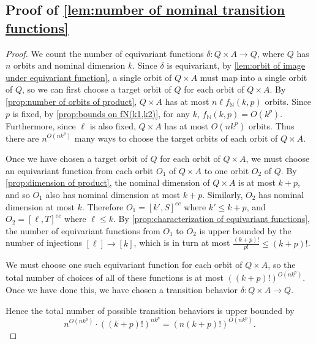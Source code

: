 \documentclass[11pt,a4paper]{amsart}
\theoremstyle{definition}
\newcommand{\bb}{\mathbb}
\begin{document}
\subsection{Proof of \autoref{lem:number of nominal transition functions}} \label{appendix:proof of number of nominal transition functions}

\begin{proof}
    We count the number of equivariant functions $\delta : Q \times A \to Q$, where $Q$ has $n$ orbits and nominal dimension $k$. 
    Since $\delta$ is equivariant, by \autoref{lem:orbit of image under equivariant function}, a single orbit of $Q \times A$ must map into a single orbit of $Q$, so we can first choose a target orbit of $Q$ for each orbit of $Q \times A$.
    By \autoref{prop:number of orbits of product}, $Q \times A$ has at most $n \ell f_{\bb N}(k,p)$ orbits.
    Since $p$ is fixed, by \autoref{prop:bounds on fN(k1,k2)}, for any $k$, $f_{\bb N}(k,p) = O(k^{p})$.
    Furthermore, since $\ell$ is also fixed, $Q \times A$ has at most $O(nk^{p})$ orbits.
    Thus there are $n^{O(nk^{p})}$ many ways to choose the target orbits of each orbit of $Q \times A$. 
    
    Once we have chosen a target orbit of $Q$ for each orbit of $Q \times A$, we must choose an equivariant function from each orbit $O_1$ of $Q \times A$ to one orbit $O_2$ of $Q$. 
    By \autoref{prop:dimension of product}, the nominal dimension of $Q \times A$ is at most $k+p$, and so $O_1$ also has nominal dimension at most $k+p$.
    Similarly, $O_2$ has nominal dimension at most $k$. 
    Therefore $O_1 = [k',S]^{ec}$ where $k' \leq k+p$, and $O_2 = [\ell,T]^{ec}$ where $\ell \leq k$.
    By \autoref{prop:characterization of equivariant functions}, the number of equivariant functions from $O_1$ to $O_2$ is upper bounded by the number of injections $[\ell] \to [k]$, which is in turn at most $\frac{(k+p)!}{p!} \leq (k+p)!$.
    
    We must choose one such equivariant function for each orbit of $Q \times A$, so the total number of choices of all of these functions is at most $\left((k+p)!\right)^{O(nk^{p})}$. 
    Once we have done this, we have chosen a transition behavior $\delta : Q \times A \to Q$.
    
    Hence the total number of possible transition behaviors is upper bounded by 
    \[
    n^{O(nk^{p})} \cdot \left((k+p)!\right)^{nk^{p}}= \left(n(k+p)!\right)^{O(nk^{p})}.
    \]
\end{proof}
\end{document}
